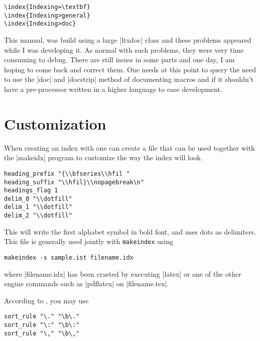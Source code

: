 \begin{verbatim}
\index{Indexing=\textbf}
\index{Indexing>general}
\index{Indexing>doc}
\end{verbatim}

This manual, was build using a large |ltxdoc| class and these problems appeared while I was developing it. As normal with such problems, they were very time consuming to debug. There are still issues in some parts and one day, I am hoping to come back and correct them. One needs at this point to query the need to use the |doc| and |docstrip| method of documenting macros and if it shouldn't have a pre-processor written in a higher language to ease development. 

\section{Customization}

When creating an index with  one can create a  file that can be used together with the |makeidx| program to customize the way the index will look.

\begin{verbatim}
heading_prefix "{\\bfseries\\hfil "
heading_suffix "\\hfil}\\nopagebreak\n"
headings_flag 1
delim_0 "\\dotfill"
delim_1 "\\dotfill"
delim_2 "\\dotfill"
\end{verbatim}

This will write the first alphabet symbol in bold font, and uses dots as delimiters. This file is generally  used jointly with \texttt{makeindex} using

\begin{verbatim}
makeindex -s sample.ist filename.idx
\end{verbatim}

where |filename.idx| has been craeted by executing |latex| or one of the other engine commands such as |pdflatex| on |filename.tex|.


According to \citep{gabora}, you may use

\begin{verbatim}
sort_rule "\." "\b\."
sort_rule "\:" "\b\:"
sort_rule "\," "\b\,"
\end{verbatim}


